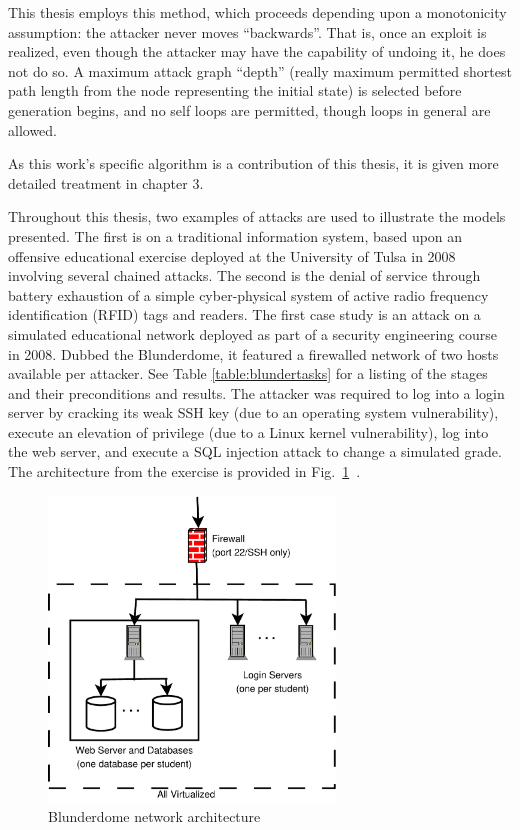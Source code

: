 This thesis employs this method, which proceeds 
depending upon a monotonicity assumption: the attacker never moves ``backwards''.
That is, once an exploit is realized, even though the attacker may have the capability
of undoing it, he does not do so. A maximum attack graph ``depth'' (really 
maximum permitted shortest path length from the
node representing the initial state) is selected before generation begins, and
no self loops are permitted, though loops in general are allowed.

As this work's specific algorithm is a contribution of this thesis, it is given
more detailed treatment in chapter 3.

Throughout this thesis, two examples of attacks are used to illustrate the models presented.
The first is on a traditional information system, based upon an offensive educational exercise
deployed at the University of Tulsa in 2008 involving several chained attacks. The second is the 
denial of service through battery exhaustion of a simple
cyber-physical system of active radio frequency identification (RFID) tags and readers.
The first case study is an attack on a simulated educational network deployed as part of a
security engineering course in 2008. Dubbed the Blunderdome, it featured a firewalled network of
two hosts available per attacker. See Table \ref{table:blundertasks} for a listing of the stages and
their preconditions and results. The attacker was required to log into a login server by cracking
its weak SSH key (due to an operating system vulnerability), execute an elevation of privilege (due
to a Linux kernel vulnerability), log into the web server, and execute a SQL injection attack to
change a simulated grade. The architecture from the exercise is provided in 
Fig.~\ref{fig:blunderarch}~\cite{louthan2010blunderdome}.

\begin{figure}
\centering
\includegraphics[width=3in]{blunderarch}
\caption{Blunderdome network architecture}
\label{fig:blunderarch}
\end{figure}

